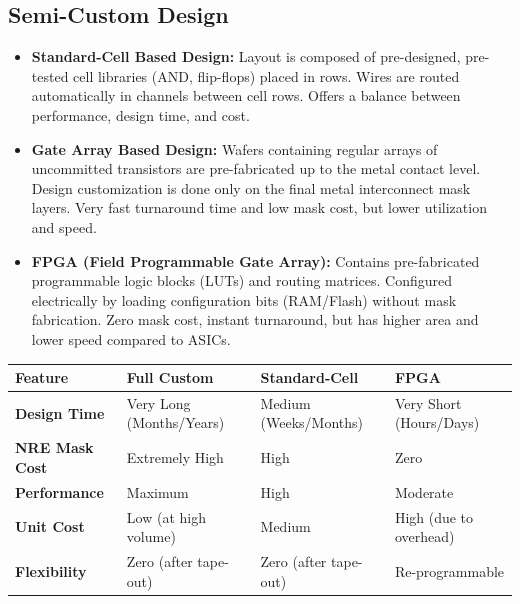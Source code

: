 \documentclass[12pt,a4paper]{article}
\renewcommand{\arraystretch}{1.45}
\begin{document}
\subsection{Semi-Custom Design}
\begin{itemize}[leftmargin=*, itemsep=3.5pt]
  \item \textbf{Standard-Cell Based Design:} Layout is composed of pre-designed, pre-tested cell libraries (AND, flip-flops) placed in rows. Wires are routed automatically in channels between cell rows. Offers a balance between performance, design time, and cost.
  \item \textbf{Gate Array Based Design:} Wafers containing regular arrays of uncommitted transistors are pre-fabricated up to the metal contact level. Design customization is done only on the final metal interconnect mask layers. Very fast turnaround time and low mask cost, but lower utilization and speed.
  \item \textbf{FPGA (Field Programmable Gate Array):} Contains pre-fabricated programmable logic blocks (LUTs) and routing matrices. Configured electrically by loading configuration bits (RAM/Flash) without mask fabrication. Zero mask cost, instant turnaround, but has higher area and lower speed compared to ASICs.
\end{itemize}

\begin{tcolorbox}[tikzbox, title={Comparison of Design Methodologies}]
\renewcommand{\arraystretch}{1.4}
\par\noindent
\begin{tabularx}{\linewidth}{|B{2.2cm}|Y|Y|Y|}
\hline
\textbf{Feature} & \textbf{\color{myred}Full Custom} & \textbf{\color{myteal}Standard-Cell} & \textbf{\color{myamber}FPGA} \\
\hline
\textbf{Design Time} & Very Long (Months/Years) & Medium (Weeks/Months) & Very Short (Hours/Days) \\
\hline
\textbf{NRE Mask Cost} & Extremely High & High & Zero \\
\hline
\textbf{Performance} & Maximum & High & Moderate \\
\hline
\textbf{Unit Cost} & Low (at high volume) & Medium & High (due to overhead) \\
\hline
\textbf{Flexibility} & Zero (after tape-out) & Zero (after tape-out) & Re-programmable \\
\hline
\end{tabularx}
\end{tcolorbox}
\end{document}
